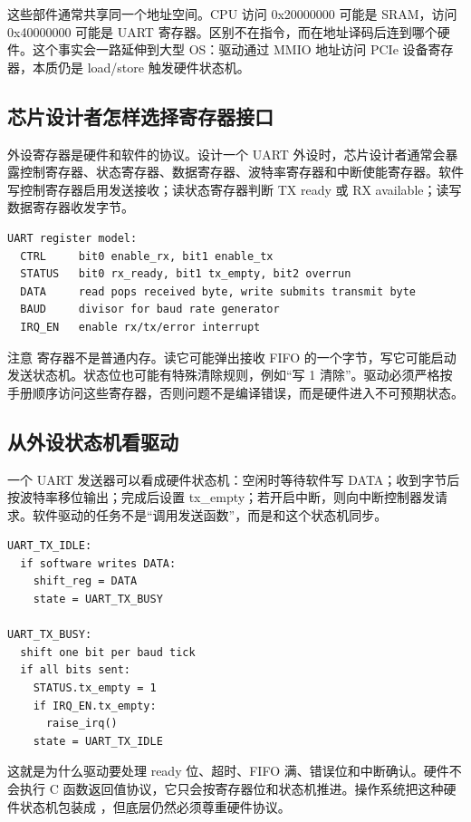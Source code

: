 这些部件通常共享同一个地址空间。CPU 访问 0x20000000 可能是 SRAM，访问 0x40000000 可能是 UART 寄存器。区别不在指令，而在地址译码后连到哪个硬件。这个事实会一路延伸到大型 OS：驱动通过 MMIO 地址访问 PCIe 设备寄存器，本质仍是 load/store 触发硬件状态机。

\subsection{芯片设计者怎样选择寄存器接口}

外设寄存器是硬件和软件的协议。设计一个 UART 外设时，芯片设计者通常会暴露控制寄存器、状态寄存器、数据寄存器、波特率寄存器和中断使能寄存器。软件写控制寄存器启用发送接收；读状态寄存器判断 TX ready 或 RX available；读写数据寄存器收发字节。

\begin{lstlisting}
UART register model:
  CTRL     bit0 enable_rx, bit1 enable_tx
  STATUS   bit0 rx_ready, bit1 tx_empty, bit2 overrun
  DATA     read pops received byte, write submits transmit byte
  BAUD     divisor for baud rate generator
  IRQ_EN   enable rx/tx/error interrupt
\end{lstlisting}

注意  寄存器不是普通内存。读它可能弹出接收 FIFO 的一个字节，写它可能启动发送状态机。状态位也可能有特殊清除规则，例如“写 1 清除”。驱动必须严格按手册顺序访问这些寄存器，否则问题不是编译错误，而是硬件进入不可预期状态。

\subsection{从外设状态机看驱动}

一个 UART 发送器可以看成硬件状态机：空闲时等待软件写 DATA；收到字节后按波特率移位输出；完成后设置 tx\_empty；若开启中断，则向中断控制器发请求。软件驱动的任务不是“调用发送函数”，而是和这个状态机同步。

\begin{lstlisting}
UART_TX_IDLE:
  if software writes DATA:
    shift_reg = DATA
    state = UART_TX_BUSY

UART_TX_BUSY:
  shift one bit per baud tick
  if all bits sent:
    STATUS.tx_empty = 1
    if IRQ_EN.tx_empty:
      raise_irq()
    state = UART_TX_IDLE
\end{lstlisting}

这就是为什么驱动要处理 ready 位、超时、FIFO 满、错误位和中断确认。硬件不会执行 C 函数返回值协议，它只会按寄存器位和状态机推进。操作系统把这种硬件状态机包装成 ，但底层仍然必须尊重硬件协议。

